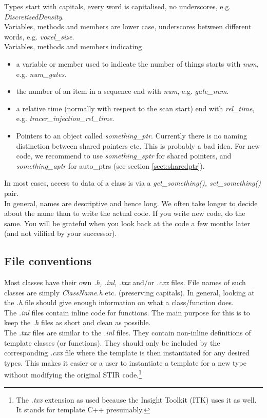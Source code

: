 \documentclass{article}
\begin{document}
Types start with capitals, every word is capitalised, no underscores, 
e.g. \textit{DiscretisedDensity}.\\
Variables, methods and members are lower case, underscores between 
different words, e.g. \textit{voxel\_size}.\\
Variables, methods and members indicating 
\begin{itemize}
\item 
a variable or member used to indicate the number of things starts 
with \textit{num}, e.g. \textit{num\_gates}.
\item 
the number of an item in a sequence end with \textit{num}, e.g. \textit{gate\_num}.
\item 
a relative time (normally with respect to the scan start) end 
with \textit{rel\_time}, e.g. \textit{tracer\_injection\_rel\_time}.
\item 
Pointers to an object called \textit{something\_ptr}. Currently there 
is no naming distinction between shared pointers etc. This is 
probably a bad idea. For new code, we recommend to use \textit{something\_sptr} 
for shared pointers, and \textit{something\_aptr} for auto\_ptrs (see 
section \ref{sect:sharedptr}).
\end{itemize}

In most cases, access to data of a class is via a \textit{get\_something(), 
set\_something()} pair.\\
In general, names are descriptive and hence long. We often take 
longer to decide about the name than to write the actual code. 
If you write new code, do the same. You will be grateful when 
you look back at the code a few months later (and not vilified 
by your successor). 

\subsection{
File conventions }

Most classes have their own \textit{.h,} .\textit{inl}, \textit{.txx} and/or \textit{.cxx} files. 
File names of such classes are simply \textit{ClassName.h} {\nobreakspace}etc. 
(preserving capitals). In general, looking at 
the \textit{.h} file should give enough information on what a class/function 
does. \\
The \textit{.inl} files contain inline code 
for functions. The main purpose for this is to keep the \textit{.h} 
files as short and clean as possible. \\
The \textit{.txx} files are similar to the \textit{.inl} files. They contain non-inline 
definitions of template classes (or functions). They should only be included by the
corresponding \textit{.cxx} file where the template is then instantiated for any desired types.
This makes it easier or a user to instantiate a template for a new type without modifying the
original STIR code.\footnote{The \textit{.txx} extension as used because the Insight Toolkit (ITK) 
uses it as well. It stands for template C++ presumably.}
\end{document}
